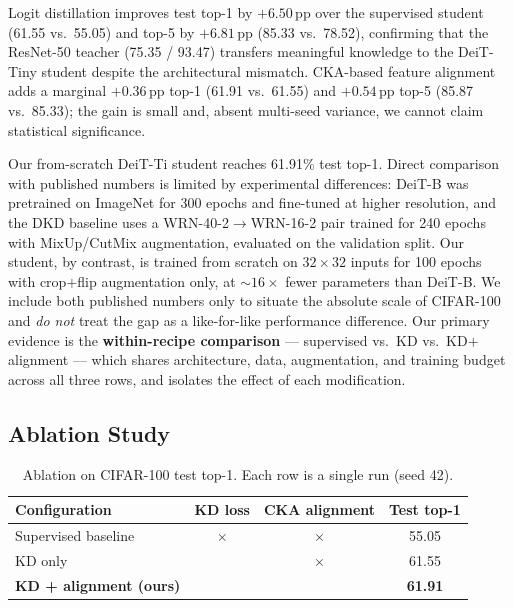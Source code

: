 \documentclass[11pt, letterpaper]{article}
\begin{document}
Logit distillation improves test top-1 by $+6.50$\,pp over the supervised
student (61.55 vs.\ 55.05) and top-5 by $+6.81$\,pp (85.33 vs.\ 78.52),
confirming that the ResNet-50 teacher (75.35 / 93.47) transfers meaningful
knowledge to the DeiT-Tiny student despite the architectural mismatch.
CKA-based feature alignment adds a marginal $+0.36$\,pp top-1 (61.91 vs.\
61.55) and $+0.54$\,pp top-5 (85.87 vs.\ 85.33); the gain is small and,
absent multi-seed variance, we cannot claim statistical significance.

Our from-scratch DeiT-Ti student reaches 61.91\% test top-1. Direct
comparison with published numbers is limited by experimental differences:
DeiT-B was pretrained on ImageNet for 300 epochs and fine-tuned at higher
resolution, and the DKD baseline uses a WRN-40-2$\to$WRN-16-2 pair trained
for 240 epochs with MixUp/CutMix augmentation, evaluated on the validation
split. Our student, by contrast, is trained from scratch on $32\times32$
inputs for 100 epochs with crop$+$flip augmentation only, at $\sim$$16\times$
fewer parameters than DeiT-B. We include both published numbers only to
situate the absolute scale of CIFAR-100 and \emph{do not} treat the gap as
a like-for-like performance difference. Our primary evidence is the
\textbf{within-recipe comparison} --- supervised vs.\ KD vs.\ KD$+$alignment
--- which shares architecture, data, augmentation, and training budget
across all three rows, and isolates the effect of each modification.

\subsection{Ablation Study}

\label{sec:ablation}

\begin{table}[htbp]
\centering
\begin{tabular}{lccc}
\toprule
\textbf{Configuration} & \textbf{KD loss} & \textbf{CKA alignment} & \textbf{Test top-1} \\
\midrule
Supervised baseline & $\times$ & $\times$ & 55.05 \\
KD only & \checkmark & $\times$ & 61.55 \\
\textbf{KD + alignment (ours)} & \checkmark & \checkmark & \textbf{61.91} \\
\bottomrule
\end{tabular}
\caption{Ablation on CIFAR-100 test top-1. Each row is a single run (seed 42).}
\label{tab:ablation}
\end{table}
\end{document}
